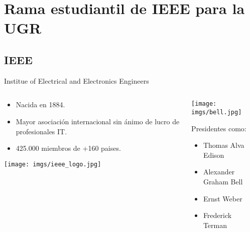 
\section[IEEE SB UGR]{Rama estudiantil de IEEE para la UGR}

\subsection{IEEE}
\begin{frame}{Institue of Electrical and Electronics Engineers}
    \begin{columns}\begin{column}{0.50\textwidth}
        \begin{itemize}
            \item Nacida en 1884.
            \item Mayor asociación internacional sin ánimo de lucro de profesionales IT.
            \item 425.000 miembros de +160 paises.
        \end{itemize}
        \texttt{[image: imgs/ieee\_logo.jpg]}
    \end{column}\begin{column}{0.50\textwidth}
        \centering
        \texttt{[image: imgs/bell.jpg]}
        
        Presidentes como:
        \begin{itemize}
            \item Thomas Alva Edison
            \item Alexander Graham Bell
            \item Ernst Weber
            \item Frederick Terman
        \end{itemize}
    \end{column}\end{columns}
\end{frame}

